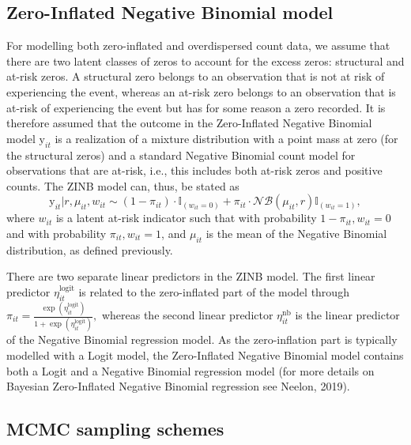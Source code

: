 \documentclass[a4paper, preprint, 3p,
authoryear]{elsarticle} %
\begin{document}
\subsection{Zero-Inflated Negative Binomial
model}\label{zero-inflated-negative-binomial-model}

For modelling both zero-inflated and overdispersed count data, we assume
that there are two latent classes of zeros to account for the excess
zeros: structural and at-risk zeros. A structural zero belongs to an
observation that is not at risk of experiencing the event, whereas an
at-risk zero belongs to an observation that is at-risk of experiencing
the event but has for some reason a zero recorded. It is therefore
assumed that the outcome in the Zero-Inflated Negative Binomial model
\(\text{y}_{it}\) is a realization of a mixture distribution with a
point mass at zero (for the structural zeros) and a standard Negative
Binomial count model for observations that are at-risk, i.e., this
includes both at-risk zeros and positive counts. The ZINB model can,
thus, be stated as \begin{equation*}
 \text{y}_{it}|r,\mu_{it},w_{it} \sim (1-\pi_{it}) \cdot \mathbb{I}_{(w_{it} = 0)} + \pi_{it} \cdot \mathcal{NB}(\mu_{it},r) \mathbb{I}_{(w_{it}=1)},
\end{equation*} where \({w_{it}}\) is a latent at-risk indicator such
that with probability \({1-\pi_{it}, w_{it} = 0}\) and with probability
\({\pi_{it}, w_{it} = 1}\), and \({\mu_{it}}\) is the mean of the
Negative Binomial distribution, as defined previously.

There are two separate linear predictors in the ZINB model. The first
linear predictor \({\eta_{it}^{\text{logit}}}\) is related to the
zero-inflated part of the model through
\({\pi_{it} = \frac{\exp(\eta_{it}^{\text{logit}})}{1+\exp(\eta_{it}^{\text{logit}})},}\)
whereas the second linear predictor \({\eta_{it}^{\text{nb}}}\) is the
linear predictor of the Negative Binomial regression model. As the
zero-inflation part is typically modelled with a Logit model, the
Zero-Inflated Negative Binomial model contains both a Logit and a
Negative Binomial regression model (for more details on Bayesian
Zero-Inflated Negative Binomial regression see Neelon, 2019).

\subsection{MCMC sampling schemes}\label{mcmc-sampling-schemes}
\end{document}
